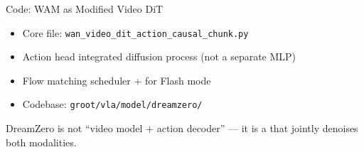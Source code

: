 \begin{frame}{Code: WAM as Modified Video DiT}
\begin{methodbox}
\begin{itemize}
    \item Core file: \texttt{wan\_video\_dit\_action\_causal\_chunk.py}
    \item Action head integrated  diffusion process
          (not a separate MLP)
    \item Flow matching scheduler + 
          for Flash mode
    \item Codebase: \texttt{groot/vla/model/dreamzero/}
\end{itemize}
\end{methodbox}

\vspace{0.5em}
\begin{softbox}
 DreamZero is not
``video model + action decoder'' --- it is a
 that jointly denoises both modalities.
\end{softbox}
\end{frame}


\begin{frame}[plain]
\begin{center}
\vfill
{\Huge{}}\\[1em]
{\large{}}
\vfill
\end{center}
\end{frame}

